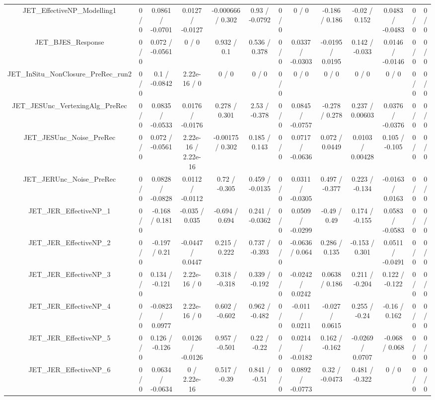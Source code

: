 \documentclass[10pt]{article}
\begin{document}
\begin{table}[htbp]
\begin{center}
\begin{tabular}{|c|c|c|c|c|c|c|c|c|c|c|c|c|}
  JET_EffectiveNP_Modelling1 & 0 / 0 & 0.0861 / -0.0701 & 0.0127 / -0.0127 & -0.000666 / 0.302 & 0.93 / -0.0792 & 0 / 0 & 0 / 0 & -0.186 / 0.186 & -0.02 / 0.152 & 0.0483 / -0.0483 & 0 / 0 & 0 / 0 \\ 
  JET_BJES_Response & 0 / 0 & 0.072 / -0.0561 & 0 / 0 & 0.932 / 0.1 & 0.536 / 0.378 & 0 / 0 & 0.0337 / -0.0303 & -0.0195 / 0.0195 & 0.142 / -0.033 & 0.0146 / -0.0146 & 0 / 0 & 0 / 0 \\ 
  JET_InSitu_NonClosure_PreRec_run2 & 0 / 0 & 0.1 / -0.0842 & 2.22e-16 / 0 & 0 / 0 & 0 / 0 & 0 / 0 & 0 / 0 & 0 / 0 & 0 / 0 & 0 / 0 & 0 / 0 & 0 / 0 \\ 
  JET_JESUnc_VertexingAlg_PreRec & 0 / 0 & 0.0835 / -0.0533 & 0.0176 / -0.0176 & 0.278 / 0.301 & 2.53 / -0.378 & 0 / 0 & 0.0845 / -0.0757 & -0.278 / 0.278 & 0.237 / 0.00603 & 0.0376 / -0.0376 & 0 / 0 & 0 / 0 \\ 
  JET_JESUnc_Noise_PreRec & 0 / 0 & 0.072 / -0.0561 & 2.22e-16 / 2.22e-16 & -0.00175 / 0.302 & 0.185 / 0.143 & 0 / 0 & 0.0717 / -0.0636 & 0.072 / 0.0449 & 0.0103 / 0.00428 & 0.105 / -0.105 & 0 / 0 & 0 / 0 \\ 
  JET_JERUnc_Noise_PreRec & 0 / 0 & 0.0828 / -0.0828 & 0.0112 / -0.0112 & 0.72 / -0.305 & 0.459 / -0.0135 & 0 / 0 & 0.0311 / -0.0305 & 0.497 / -0.377 & 0.223 / -0.134 & -0.0163 / 0.0163 & 0 / 0 & 0 / 0 \\ 
  JET_JER_EffectiveNP_1 & 0 / 0 & -0.168 / 0.181 & -0.035 / 0.035 & -0.694 / 0.694 & 0.241 / -0.0362 & 0 / 0 & 0.0509 / -0.0299 & -0.49 / 0.49 & 0.174 / -0.155 & 0.0583 / -0.0583 & 0 / 0 & 0 / 0 \\ 
  JET_JER_EffectiveNP_2 & 0 / 0 & -0.197 / 0.21 & -0.0447 / 0.0447 & 0.215 / 0.222 & 0.737 / -0.393 & 0 / 0 & -0.0636 / 0.064 & 0.286 / 0.135 & -0.153 / 0.301 & 0.0511 / -0.0491 & 0 / 0 & 0 / 0 \\ 
  JET_JER_EffectiveNP_3 & 0 / 0 & 0.134 / -0.121 & 2.22e-16 / 0 & 0.318 / -0.318 & 0.339 / -0.192 & 0 / 0 & -0.0242 / 0.0242 & 0.0638 / 0.186 & 0.211 / -0.204 & 0.122 / -0.122 & 0 / 0 & 0 / 0 \\ 
  JET_JER_EffectiveNP_4 & 0 / 0 & -0.0823 / 0.0977 & 2.22e-16 / 0 & 0.602 / -0.602 & 0.962 / -0.482 & 0 / 0 & -0.011 / 0.0211 & -0.027 / 0.0615 & 0.255 / -0.24 & -0.16 / 0.162 & 0 / 0 & 0 / 0 \\ 
  JET_JER_EffectiveNP_5 & 0 / 0 & 0.126 / -0.126 & 0.0126 / -0.0126 & 0.957 / -0.501 & 0.22 / -0.22 & 0 / 0 & 0.0214 / -0.0182 & 0.162 / -0.162 & -0.0269 / 0.0707 & -0.068 / 0.068 & 0 / 0 & 0 / 0 \\ 
  JET_JER_EffectiveNP_6 & 0 / 0 & 0.0634 / -0.0634 & 0 / 2.22e-16 & 0.517 / -0.39 & 0.841 / -0.51 & 0 / 0 & 0.0892 / -0.0773 & 0.32 / -0.0473 & 0.481 / -0.322 & 0 / 0 & 0 / 0 & 0 / 0 \\ 

\end{tabular}
\end{center}
\end{table}
\end{document}
